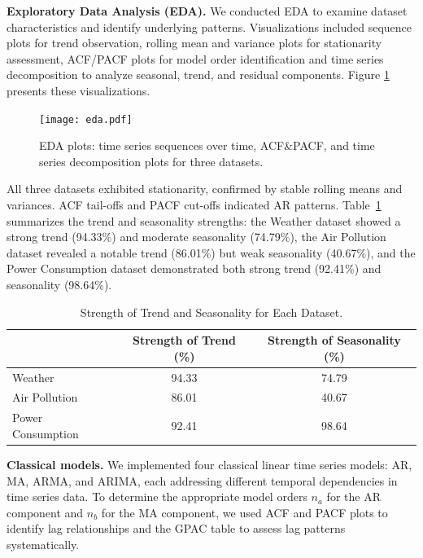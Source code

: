 \documentclass[sn-mathphys-num]{sn-jnl}
\theoremstyle{thmstyleone}%
\theoremstyle{thmstyletwo}%
\theoremstyle{thmstylethree}%
\begin{document}
\textbf{Exploratory Data Analysis (EDA).} We conducted EDA to examine dataset characteristics and identify underlying patterns. Visualizations included sequence plots for trend observation, rolling mean and variance plots for stationarity assessment, ACF/PACF plots for model order identification and time series decomposition to analyze seasonal, trend, and residual components. Figure \ref{fig:eda_plot} presents these visualizations.
\begin{figure}[]
	\begin{center}
	\texttt{[image: eda.pdf]}
	\end{center}
	\caption{EDA plots: time series sequences over time, ACF\&PACF, and time series decomposition plots for three datasets.}
	\label{fig:eda_plot}
\end{figure}
All three datasets exhibited stationarity, confirmed by stable rolling means and variances. ACF tail-offs and PACF cut-offs indicated AR patterns. Table~\ref{tab:trend_seasonality} summarizes the trend and seasonality strengths: the Weather dataset showed a strong trend (94.33\%) and moderate seasonality (74.79\%), the Air Pollution dataset revealed a notable trend (86.01\%) but weak seasonality (40.67\%), and the Power Consumption dataset demonstrated both strong trend (92.41\%) and seasonality (98.64\%). 
\begin{table}[h]
\centering
\begin{tabular}{lcc}
\hline
\textbf{}        & \textbf{Strength of Trend (\%)} & \hspace{0.5cm}\textbf{Strength of Seasonality (\%)} \\ \hline
Weather                 & 94.33                          & 74.79                                 \\ 
Air Pollution           & 86.01                          & 40.67                                 \\ 
Power Consumption       & 92.41                          & 98.64                                 \\ \hline
\end{tabular}
\caption{Strength of Trend and Seasonality for Each Dataset.}
\label{tab:trend_seasonality}
\end{table}

\textbf{Classical models.} We implemented four classical linear time series models: AR, MA, ARMA, and ARIMA, each addressing different temporal dependencies in time series data. To determine the appropriate model orders \(n_a\) for the AR component and \(n_b\) for the MA component, we used ACF and PACF plots to identify lag relationships and the GPAC table to assess lag patterns systematically. 
\end{document}
